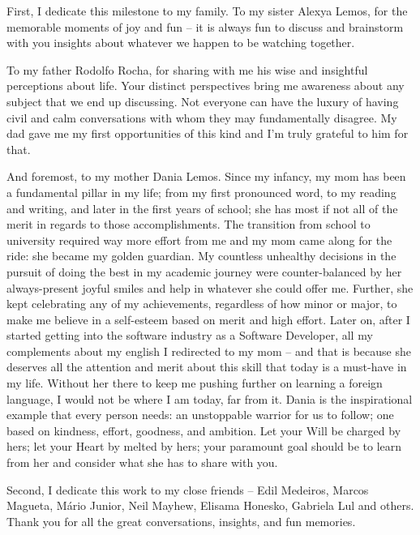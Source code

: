 First, I dedicate this milestone to my family. To my sister Alexya Lemos, for the memorable moments of joy and fun -- it is always fun to
discuss and brainstorm with you insights about whatever we happen to be watching together.

To my father Rodolfo Rocha, for sharing with me his wise and insightful perceptions about life.
Your distinct perspectives bring me awareness about any subject that we end up
discussing. Not everyone can have the luxury of having
civil and calm conversations with whom they may fundamentally disagree. My dad gave me my first
opportunities of this kind and I'm truly grateful to him for that.

And foremost, to my mother Dania Lemos. Since my infancy, my mom has been a fundamental pillar in my life;
from my first pronounced word, to my reading and writing, and later in the first years of school; she has most if not
all of the merit in regards to those accomplishments. The transition from school to university required way more effort
from me and my mom came along for the ride: she became my golden guardian. My countless unhealthy decisions in the pursuit
of doing the best in my academic journey were counter-balanced by her always-present joyful smiles and help in whatever
she could offer me. Further, she kept celebrating any of my achievements, regardless of how minor or major, to make me
believe in a self-esteem based on merit and high effort. Later on, after I started getting into the software industry
as a Software Developer, all my complements about my english I redirected to my mom -- and that is because she deserves
all the attention and merit about this skill that today is a must-have in my life. Without her there to keep me pushing
further on learning a foreign language, I would not be where I am today, far from it. Dania is the inspirational example that every
person needs: an unstoppable warrior for us to follow; one based on kindness, effort, goodness, and ambition. Let your Will
be charged by hers; let your Heart by melted by hers; your paramount goal should be to learn from her and consider what
she has to share with you.

Second, I dedicate this work to my close friends -- Edil Medeiros, Marcos Magueta, Mário Junior, Neil Mayhew,
Elisama Honesko, Gabriela Lul and others. Thank you for
all the great conversations, insights, and fun memories.

